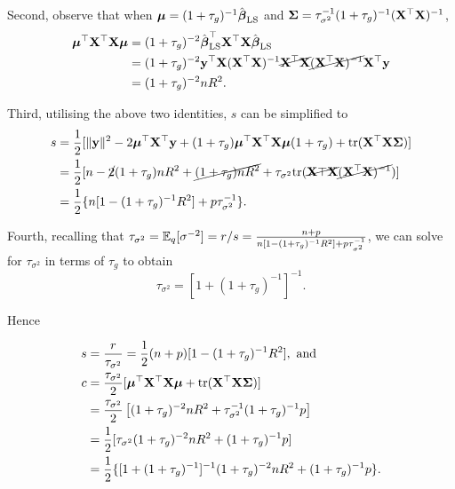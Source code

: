 \documentclass{amsart}[12pt]
\begin{document}
Second, observe that when ${\boldsymbol \mu} = (1 + \tau_g)^{-1} \hat{{\boldsymbol \beta}}_{\text{LS}}$ and ${\boldsymbol \Sigma} = \tau_{\sigma^2}^{-1} (1 + \tau_g)^{-1} ({\bf X}^\top {\bf X})^{-1}$,
\begin{align*}
	{\boldsymbol\mu}^\top {\bf X}^\top {\bf X} {\boldsymbol\mu} & = (1 + \tau_g)^{-2} \hat{{\boldsymbol \beta}}_{\text{LS}}^\top {\bf X}^\top {\bf X} \hat{{\boldsymbol \beta}}_{\text{LS}}                                                        \\
	                            & = (1 + \tau_g)^{-2} {\bf y}^\top {\bf X} ({\bf X}^\top {\bf X})^{-1} \cancel{{\bf X}^\top {\bf X}} \cancel{({\bf X}^\top {\bf X})^{-1}} {\bf X}^\top {\bf y} \\
	                            & = (1 + \tau_g)^{-2} n R^2.                                                                                           
\end{align*}

Third, utilising the above two identities, $s$ can be simplified to
\begin{align*}
	s & = \frac{1}{2} [\|{\bf y}\|^2 - 2 {\boldsymbol \mu}^\top {\bf X}^\top {\bf y} + (1 + \tau_g) {\boldsymbol \mu}^\top {\bf X}^\top {\bf X} {\boldsymbol\mu} (1 + \tau_g) +  \text{tr} ({\bf X}^\top {\bf X} {\boldsymbol\Sigma})]                 \\
	  & = \frac{1}{2} [n - \cancel{2} (1 + \tau_g) n R ^2 + \cancel{(1 + \tau_g) n R^2} + \tau_{\sigma^2} \text{tr} (\cancel{{\bf X}\top {\bf X}} \cancel{({\bf X}^\top {\bf X})^{-1}})] \\
	  & = \frac{1}{2} \{ n[1 - (1 + \tau_g)^{-1} R^2] + p \tau_{\sigma^2}^{-1} \}.                                                                                 
\end{align*}

Fourth, recalling that $\tau_{\sigma^2} = \mathbb{E}_q [\sigma^{-2}] = r/s = \frac{n+p}{n[1 - (1 + \tau_g)^{-1} R^2] + p \tau_{\sigma^2}^{-1}}$, we can solve for $\tau_{\sigma^2}$ in terms of $\tau_g$ to obtain
\[
	\tau_{\sigma^2} = [1 + (1 + \tau_g)^{-1}]^{-1}.
\]

Hence

\begin{align*}
	s & = \frac{r}{\tau_{\sigma^2}} = \frac{1}{2} (n + p) [1 - (1 + \tau_g)^{-1} R^2], \text{ and }                \\
	c & = \frac{\tau_{\sigma^2}}{2}[{\boldsymbol \mu}^\top {\bf X}^\top {\bf X} {\boldsymbol\mu} + \text{tr} ({\bf X}^\top {\bf X} {\boldsymbol\Sigma})]                      \\
	  & = \frac{\tau_{\sigma^2}}{2}\left[(1 + \tau_g)^{-2} n R^2 + \tau_{\sigma^2}^{-1} (1 + \tau_g)^{-1} p\right] \\
	  & = \frac{1}{2} [ \tau_{\sigma^2} (1 + \tau_g)^{-2} n R^2 + (1 + \tau_g)^{-1} p]                             \\
	  & = \frac{1}{2} \{ [1 + (1 + \tau_g)^{-1}]^{-1} (1 + \tau_g)^{-2} n R^2 + (1 + \tau_g)^{-1} p\}.             
\end{align*}
\end{document}
